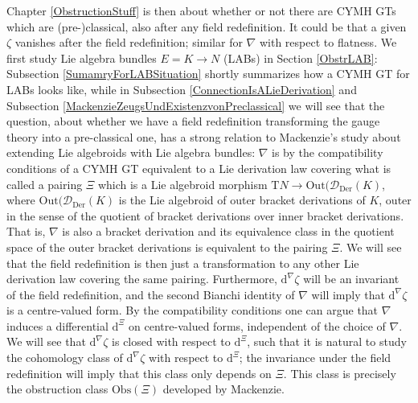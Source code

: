 Chapter \ref{ObstructionStuff} is then about whether or not there are CYMH GTs which are (pre-)classical, also after any field redefinition. It could be that a given $\zeta$ vanishes after the field redefinition; similar for $\nabla$ with respect to flatness. We first study Lie algebra bundles $E = K \to N$ (LABs) in Section \ref{ObstrLAB}: Subsection \ref{SumamryForLABSituation} shortly summarizes how a CYMH GT for LABs looks like, while in Subsection \ref{ConnectionIsALieDerivation} 
and Subsection \ref{MackenzieZeugsUndExistenzvonPreclassical} we will see that the question, about whether we have a field redefinition transforming the gauge theory into a pre-classical one, has a strong relation to Mackenzie's study about extending Lie algebroids with Lie algebra bundles: $\nabla$ is by the compatibility conditions of a CYMH GT equivalent to a Lie derivation law covering what is called a pairing $\Xi$ which is a Lie algebroid morphism  $\mathrm{T}N \to \mathrm{Out}(\mathcal{D}_{\mathrm{Der}}(K)$, where $\mathrm{Out}(\mathcal{D}_{\mathrm{Der}}(K)$ is the Lie algebroid of outer bracket derivations of $K$, outer in the sense of the quotient of bracket derivations over inner bracket derivations. That is, $\nabla$ is also a bracket derivation and its equivalence class in the quotient space of the outer bracket derivations is equivalent to the pairing $\Xi$. We will see that the field redefinition is then just a transformation to any other Lie derivation law covering the same pairing. Furthermore, $\mathrm{d}^\nabla \zeta$ will be an invariant of the field redefinition, and the second Bianchi identity of $\nabla$ will imply that $\mathrm{d}^\nabla \zeta$ is a centre-valued form. By the compatibility conditions one can argue that $\nabla$ induces a differential $\mathrm{d}^\Xi$ on centre-valued forms, independent of the choice of $\nabla$. We will see that $\mathrm{d}^\nabla \zeta$ is closed with respect to $\mathrm{d}^\Xi$, such that it is natural to study the cohomology class of $\mathrm{d}^\nabla \zeta$ with respect to $\mathrm{d}^\Xi$; the invariance under the field redefinition will imply that this class only depends on $\Xi$. This class is precisely the obstruction class $\mathrm{Obs}(\Xi)$ developed by Mackenzie.


